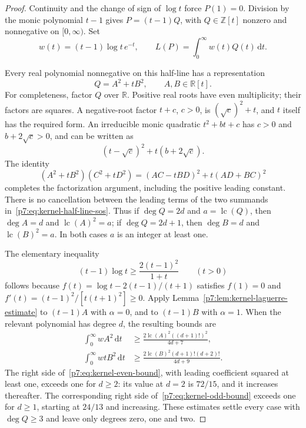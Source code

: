 \documentclass[11pt,a4paper]{article}
\theoremstyle{definition}
\theoremstyle{remark}
\newcommand{\Z}{\mathbb Z}
\newcommand{\dd}{\,\mathrm d}
\DeclareMathOperator{\lc}{lc}
\numberwithin{equation}{section}
\begin{document}
\begin{proof}
Continuity and the change of sign of $\log t$ force $P(1)=0$.
Division by the monic polynomial $t-1$ gives
$P=(t-1)Q$, with $Q\in\Z[t]$ nonzero and nonnegative on
$[0,\infty)$.  Set
\[
 w(t)=(t-1)\log t\,e^{-t},\qquad L(P)=\int_0^\infty w(t)Q(t)\dd t.
\]

Every real polynomial nonnegative on this half-line has a representation
\begin{equation}\label{p7:eq:kernel-half-line-sos}
 Q=A^2+tB^2,\qquad A,B\in\mathbb R[t].
\end{equation}
For completeness, factor $Q$ over $\mathbb R$.  Positive real roots have
even multiplicity; their factors are squares.  A negative-root factor
$t+c$, $c>0$, is $(\sqrt c)^2+t$, and $t$ itself has the required form.
An irreducible monic quadratic $t^2+bt+c$ has $c>0$ and
$b+2\sqrt c>0$, and can be written as
\[
 (t-\sqrt c)^2+t(b+2\sqrt c).
\]
The identity
\[
 (A^2+tB^2)(C^2+tD^2)=(AC-tBD)^2+t(AD+BC)^2
\]
completes the factorization argument, including the positive leading
constant.  There is no cancellation between the leading terms of the
two summands in~\eqref{p7:eq:kernel-half-line-sos}.  Thus if
$\deg Q=2d$ and $a=\lc(Q)$, then $\deg A=d$ and $\lc(A)^2=a$;
if $\deg Q=2d+1$, then $\deg B=d$ and $\lc(B)^2=a$.
In both cases $a$ is an integer at least one.

The elementary inequality
\begin{equation}\label{p7:eq:kernel-log-bound}
 (t-1)\log t\geq\frac{2(t-1)^2}{1+t}\qquad(t>0)
\end{equation}
follows because $f(t)=\log t-2(t-1)/(t+1)$ satisfies
$f(1)=0$ and $f'(t)=(t-1)^2/[t(t+1)^2]\geq0$.
Apply Lemma~\ref{p7:lem:kernel-laguerre-estimate} to $(t-1)A$ with
$\alpha=0$, and to $(t-1)B$ with $\alpha=1$.
When the relevant polynomial has degree $d$, the resulting bounds are
\begin{align}
 \int_0^\infty wA^2\dd t
 &\geq\frac{2\lc(A)^2((d+1)!)^2}{4d+7},\label{p7:eq:kernel-even-bound}\\
 \int_0^\infty wtB^2\dd t
 &\geq\frac{2\lc(B)^2(d+1)!(d+2)!}{4d+9}.
 \label{p7:eq:kernel-odd-bound}
\end{align}
The right side of~\eqref{p7:eq:kernel-even-bound}, with leading coefficient
squared at least one, exceeds one for $d\geq2$: its value at $d=2$ is
$72/15$, and it increases thereafter.
The corresponding right side of~\eqref{p7:eq:kernel-odd-bound} exceeds one
for $d\geq1$, starting at $24/13$ and increasing.
These estimates settle every case with $\deg Q\geq3$ and leave only
degrees zero, one and two.


\end{proof}
\end{document}
